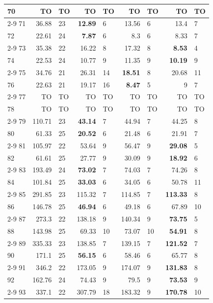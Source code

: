 \begin{longtable}{lr@{\hskip 4pt}l@{\hskip 12pt}r@{\hskip 4pt}l@{\hskip 12pt}r@{\hskip 4pt}l@{\hskip 12pt}r@{\hskip 4pt}l@{\hskip 12pt}}
70 & TO & TO & TO & TO & TO & TO & TO & TO \\
\cmidrule{2-9}
71 & 36.88 & 23 & \textbf{12.89} & 6 & 13.56 & 6 & 13.4 & 7 \\
72 & 22.61 & 24 & \textbf{7.87} & 6 & 8.3 & 6 & 8.33 & 7 \\
\cmidrule{2-9}
73 & 35.38 & 22 & 16.22 & 8 & 17.32 & 8 & \textbf{8.53} & 4 \\
74 & 22.53 & 24 & 10.77 & 9 & 11.35 & 9 & \textbf{10.19} & 9 \\
\cmidrule{2-9}
75 & 34.76 & 21 & 26.31 & 14 & \textbf{18.51} & 8 & 20.68 & 11 \\
76 & 22.63 & 21 & 19.17 & 16 & \textbf{8.47} & 5 & 9 & 7 \\
\cmidrule{2-9}
77 & TO & TO & TO & TO & TO & TO & TO & TO \\
78 & TO & TO & TO & TO & TO & TO & TO & TO \\
\cmidrule{2-9}
79 & 110.71 & 23 & \textbf{43.14} & 7 & 44.94 & 7 & 44.25 & 8 \\
80 & 61.33 & 25 & \textbf{20.52} & 6 & 21.48 & 6 & 21.91 & 7 \\
\cmidrule{2-9}
81 & 105.97 & 22 & 53.64 & 9 & 56.47 & 9 & \textbf{29.08} & 5 \\
82 & 61.61 & 25 & 27.77 & 9 & 30.09 & 9 & \textbf{18.92} & 6 \\
\cmidrule{2-9}
83 & 193.49 & 24 & \textbf{73.02} & 7 & 74.03 & 7 & 74.26 & 8 \\
84 & 101.84 & 25 & \textbf{33.03} & 6 & 34.05 & 6 & 50.78 & 11 \\
\cmidrule{2-9}
85 & 291.85 & 23 & 115.32 & 7 & 114.85 & 7 & \textbf{113.33} & 8 \\
86 & 146.78 & 25 & \textbf{46.94} & 6 & 49.18 & 6 & 67.89 & 10 \\
\cmidrule{2-9}
87 & 273.3 & 22 & 138.18 & 9 & 140.34 & 9 & \textbf{73.75} & 5 \\
88 & 143.98 & 25 & 69.33 & 10 & 73.07 & 10 & \textbf{54.91} & 8 \\
\cmidrule{2-9}
89 & 335.33 & 23 & 138.85 & 7 & 139.15 & 7 & \textbf{121.52} & 7 \\
90 & 171.1 & 25 & \textbf{56.15} & 6 & 58.46 & 6 & 65.77 & 8 \\
\cmidrule{2-9}
91 & 346.2 & 22 & 173.05 & 9 & 174.07 & 9 & \textbf{131.83} & 8 \\
92 & 162.76 & 24 & 74.43 & 9 & 79.5 & 9 & \textbf{73.53} & 9 \\
\cmidrule{2-9}
93 & 337.1 & 22 & 307.79 & 18 & 183.32 & 9 & \textbf{170.78} & 10 \\

\end{longtable}
